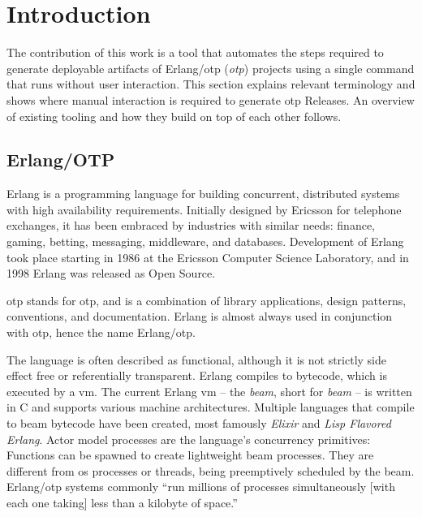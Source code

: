 \section{Introduction}

The contribution of this work is a tool that automates the steps required to generate deployable artifacts of Erlang/\acrshort{otp} (\emph{\acrlong{otp}}) projects using a single command that runs without user interaction.
This section explains relevant terminology and shows where manual interaction is required to generate \acrshort{otp} Releases. An overview of existing tooling and how they build on top of each other follows.

\subsection{Erlang/OTP}

Erlang is a programming language for building concurrent, distributed systems with high availability requirements. Initially designed by Ericsson for telephone exchanges, it has been embraced by industries with similar needs: finance, gaming, betting, messaging, middleware, and databases. Development of Erlang took place starting in 1986 at the Ericsson Computer Science Laboratory, and in 1998 Erlang was released as Open Source.~\cite{armstrong2007history}

\acrshort{otp} stands for \acrlong{otp}, and is a combination of library applications, design patterns, conventions, and documentation. Erlang is almost always used in conjunction with \acrshort{otp}, hence the name Erlang/\acrshort{otp}.~\cite{ferd}

The language is often described as functional, although it is not strictly side effect free or referentially transparent. Erlang compiles to bytecode, which is executed by a \acrfull{vm}. The current Erlang \acrshort{vm} – the \emph{\acrshort{beam}}, short for \emph{\acrlong{beam}} – is written in C and supports various machine architectures. Multiple languages that compile to \acrshort{beam} bytecode have been created, most famously \emph{Elixir} and \emph{Lisp Flavored Erlang}. Actor model processes are the language's concurrency primitives: Functions can be spawned to create lightweight \acrshort{beam} processes. They are different from \acrfull{os} processes or threads, being preemptively scheduled by the \acrshort{beam}. Erlang/\acrshort{otp} systems commonly ``run millions of processes simultaneously [with each one taking] less than a kilobyte of space.''~\cite{larson}

